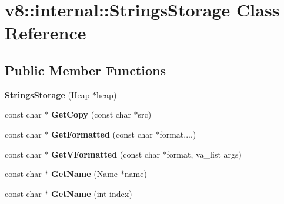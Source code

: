 \hypertarget{classv8_1_1internal_1_1_strings_storage}{}\section{v8\+:\+:internal\+:\+:Strings\+Storage Class Reference}
\label{classv8_1_1internal_1_1_strings_storage}
\subsection*{Public Member Functions}
\begin{DoxyCompactItemize}
\item 
\hypertarget{classv8_1_1internal_1_1_strings_storage_a1254485b8e8a9c6dfea6d5512124ab63}{}{\bfseries Strings\+Storage} (Heap $\ast$heap)\label{classv8_1_1internal_1_1_strings_storage_a1254485b8e8a9c6dfea6d5512124ab63}

\item 
\hypertarget{classv8_1_1internal_1_1_strings_storage_aa01abe028db7c4dac78ea7ec256732b9}{}const char $\ast$ {\bfseries Get\+Copy} (const char $\ast$src)\label{classv8_1_1internal_1_1_strings_storage_aa01abe028db7c4dac78ea7ec256732b9}

\item 
\hypertarget{classv8_1_1internal_1_1_strings_storage_a7c11ae23fafc6a733c3934fb8b8ad088}{}const char $\ast$ {\bfseries Get\+Formatted} (const char $\ast$format,...)\label{classv8_1_1internal_1_1_strings_storage_a7c11ae23fafc6a733c3934fb8b8ad088}

\item 
\hypertarget{classv8_1_1internal_1_1_strings_storage_aacca5d5f78b74e6c85f767270a9e0027}{}const char $\ast$ {\bfseries Get\+V\+Formatted} (const char $\ast$format, va\+\_\+list args)\label{classv8_1_1internal_1_1_strings_storage_aacca5d5f78b74e6c85f767270a9e0027}

\item 
\hypertarget{classv8_1_1internal_1_1_strings_storage_a684df9cbe8d91d5bf27ce2ddce36f2d5}{}const char $\ast$ {\bfseries Get\+Name} (\hyperlink{classv8_1_1internal_1_1_name}{Name} $\ast$name)\label{classv8_1_1internal_1_1_strings_storage_a684df9cbe8d91d5bf27ce2ddce36f2d5}

\item 
\hypertarget{classv8_1_1internal_1_1_strings_storage_ab4380a43d25941062646c82ec9854018}{}const char $\ast$ {\bfseries Get\+Name} (int index)\label{classv8_1_1internal_1_1_strings_storage_ab4380a43d25941062646c82ec9854018}


\end{DoxyCompactItemize}
